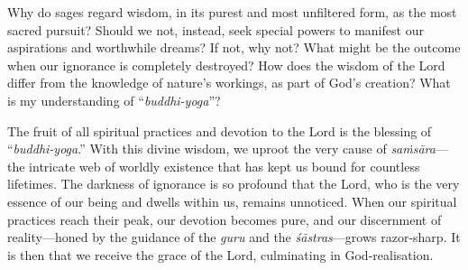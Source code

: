 \newpage
\begin{mananam}{}
\normalfont\mananamtext Why do sages regard wisdom, in its purest and most unfiltered form, as the most sacred pursuit? Should we not, instead, seek special powers to manifest our aspirations and worthwhile dreams? If not, why not?  
What might be the outcome when our ignorance is completely destroyed? How does the wisdom of the Lord differ from the knowledge of nature’s workings, as part of God’s creation? What is my understanding of “\emph{buddhi-yoga}”?
\end{mananam}
\sreflect
\begin{inspiration}{}
\normalfont\mananamtext The fruit of all spiritual practices and devotion to the Lord is the blessing of “\emph{buddhi-yoga}.” With this divine wisdom, we uproot the very cause of \emph{saṁsāra}— the intricate web of worldly existence that has kept us bound for countless lifetimes. The darkness of ignorance is so profound that the Lord, who is the very essence of our being and dwells within us, remains unnoticed. When our spiritual practices reach their peak, our devotion becomes pure, and our discernment of reality—honed by the guidance of the \emph{guru} and the \emph{śāstras}—grows razor-sharp. It is then that we receive the grace of the Lord, culminating in God-realisation.
\end{inspiration}
\newpage

